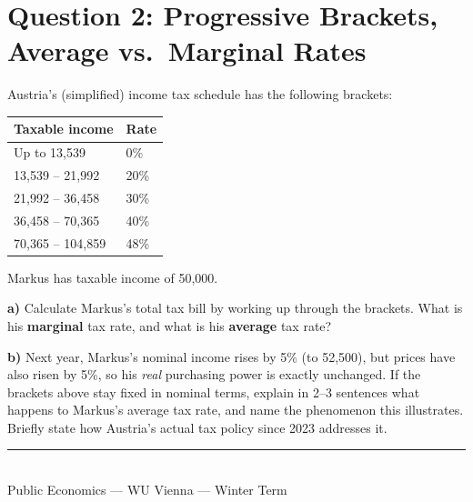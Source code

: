 \documentclass[11pt]{article}
\newcommand{\qpart}[1]{\par\vspace{0.4em}\noindent\textbf{#1}\quad}
\begin{document}
\section*{Question 2: Progressive Brackets, Average vs.\ Marginal Rates}

Austria's (simplified) income tax schedule has the following brackets:
\begin{center}
\begin{tabular}{@{}ll@{}}
\toprule
\textbf{Taxable income} & \textbf{Rate} \\
\midrule
Up to \texteuro{}13{,}539 & 0\% \\
\texteuro{}13{,}539 -- \texteuro{}21{,}992 & 20\% \\
\texteuro{}21{,}992 -- \texteuro{}36{,}458 & 30\% \\
\texteuro{}36{,}458 -- \texteuro{}70{,}365 & 40\% \\
\texteuro{}70{,}365 -- \texteuro{}104{,}859 & 48\% \\
\bottomrule
\end{tabular}
\end{center}

Markus has taxable income of \texteuro{}50{,}000.

\qpart{a)} Calculate Markus's total tax bill by working up through the brackets. What is his \textbf{marginal} tax rate, and what is his \textbf{average} tax rate?

\qpart{b)} Next year, Markus's nominal income rises by 5\% (to \texteuro{}52{,}500), but prices have also risen by 5\%, so his \emph{real} purchasing power is exactly unchanged. If the brackets above stay fixed in nominal terms, explain in 2--3 sentences what happens to Markus's average tax rate, and name the phenomenon this illustrates. Briefly state how Austria's actual tax policy since 2023 addresses it.

\vspace{1.5em}
\noindent\textcolor{wugray}{\rule{\linewidth}{0.4pt}}\\
{\footnotesize\color{wugray} Public Economics --- WU Vienna --- Winter Term}
\end{document}
